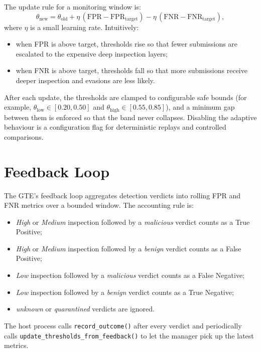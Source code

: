 \documentclass[12pt, a4paper]{report}
\begin{document}
The update rule for a monitoring window is:
\[
\theta_{\text{new}} = \theta_{\text{old}} + \eta \, (\mathrm{FPR} - \mathrm{FPR}_{\text{target}})
- \eta \, (\mathrm{FNR} - \mathrm{FNR}_{\text{target}}),
\]
where $\eta$ is a small learning rate. Intuitively:
\begin{itemize}
    \item when FPR is above target, thresholds rise so that fewer
          submissions are escalated to the expensive deep inspection
          layers;
    \item when FNR is above target, thresholds fall so that more
          submissions receive deeper inspection and evasions are less
          likely.
\end{itemize}

After each update, the thresholds are clamped to configurable safe
bounds (for example,
$\theta_{\text{low}} \in [0.20, 0.50]$ and
$\theta_{\text{high}} \in [0.55, 0.85]$), and a minimum gap between
them is enforced so that the band never collapses. Disabling the
adaptive behaviour is a configuration flag for deterministic replays
and controlled comparisons.


\section{Feedback Loop}

The GTE's feedback loop aggregates detection verdicts into rolling
FPR and FNR metrics over a bounded window. The accounting rule is:
\begin{itemize}
    \item \emph{High} or \emph{Medium} inspection followed by a
          \emph{malicious} verdict counts as a True Positive;
    \item \emph{High} or \emph{Medium} inspection followed by a
          \emph{benign} verdict counts as a False Positive;
    \item \emph{Low} inspection followed by a \emph{malicious} verdict
          counts as a False Negative;
    \item \emph{Low} inspection followed by a \emph{benign} verdict
          counts as a True Negative;
    \item \emph{unknown} or \emph{quarantined} verdicts are ignored.
\end{itemize}

The host process calls \texttt{record\_outcome()} after every verdict
and periodically calls \texttt{update\_thresholds\_from\_feedback()} to
let the manager pick up the latest metrics.
\end{document}
